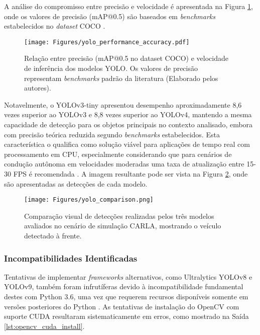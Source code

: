 A análise do compromisso entre precisão e velocidade é apresentada na Figura \ref{fig:yolo_accuracy}, onde os valores de precisão (mAP@0.5) são baseados em \textit{benchmarks} estabelecidos no \textit{dataset} COCO \cite{redmon2018yolov3incrementalimprovement, Irie2020-qx}.

\begin{figure}[H]
\centering
\texttt{[image: Figures/yolo\_performance\_accuracy.pdf]}
\caption{Relação entre precisão (mAP@0.5 no dataset COCO) e velocidade de inferência dos modelos YOLO. Os valores de precisão representam \textit{benchmarks} padrão da literatura \cite{redmon2018yolov3incrementalimprovement} (Elaborado pelos autores).}
\label{fig:yolo_accuracy}
\end{figure}

Notavelmente, o YOLOv3-tiny apresentou desempenho aproximadamente 8,6 vezes superior ao YOLOv3 e 8,8 vezes superior ao YOLOv4, mantendo a mesma capacidade de detecção para os objetos principais no contexto analisado, embora com precisão teórica reduzida segundo \textit{benchmarks} estabelecidos. Esta característica o qualifica como solução viável para aplicações de tempo real com processamento em CPU, especialmente considerando que para cenários de condução autônoma em velocidades moderadas uma taxa de atualização entre 15-30 FPS é recomendada \cite{rosique2019systematic}. A imagem resultante pode ser vista na Figura \ref{fig:yolo_comparison}, onde são apresentadas as detecções de cada modelo.

\begin{figure}[H]
\centering
\texttt{[image: Figures/yolo\_comparison.png]}
\caption{Comparação visual de detecções realizadas pelos três modelos avaliados no cenário de simulação CARLA, mostrando o veículo detectado à frente.}
\label{fig:yolo_comparison}
\end{figure}

\subsubsection{Incompatibilidades Identificadas}

Tentativas de implementar \textit{frameworks} alternativos, como Ultralytics YOLOv8 e YOLOv9, também foram infrutíferas devido à incompatibilidade fundamental destes com Python 3.6, uma vez que requerem recursos disponíveis somente em versões posteriores do Python \cite{wang_yolov1_to_yolov10}. As tentativas de instalação do OpenCV com suporte CUDA resultaram sistematicamente em erros, como mostrado na Saída \ref{lst:opencv_cuda_install}.

